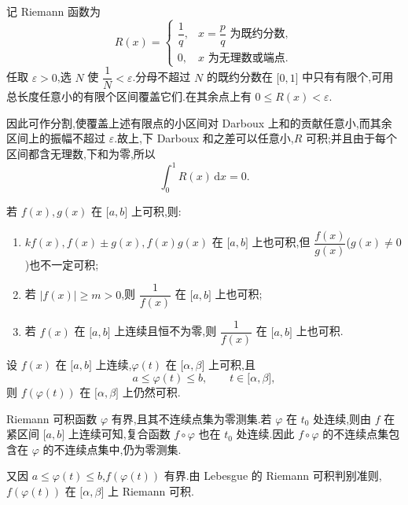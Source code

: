 \begin{solution}
    记 Riemann 函数为
    \[
        R(x)=
        \begin{cases}
            \dfrac{1}{q}, & x=\dfrac{p}{q}\text{ 为既约分数}, \\
            0,            & x\text{ 为无理数或端点}.
        \end{cases}
    \]
    任取 $\varepsilon>0$,选 $N$ 使 $\dfrac{1}{N}<\varepsilon$.分母不超过 $N$ 的既约分数在 $\lbrack0,1\rbrack$ 中只有有限个,可用总长度任意小的有限个区间覆盖它们.在其余点上有 $0\leq R(x)<\varepsilon$.

    因此可作分割,使覆盖上述有限点的小区间对 Darboux 上和的贡献任意小,而其余区间上的振幅不超过 $\varepsilon$.故上,下 Darboux 和之差可以任意小,$R$ 可积;并且由于每个区间都含无理数,下和为零,所以
    \[
        \displaystyle\int_0^1R(x)\,\mathrm{d}x=0.
    \]
\end{solution}

\begin{theorem}
    若 $f(x),g(x)$ 在 $\lbrack a,b\rbrack$ 上可积,则:
    \begin{enumerate}
        \item $kf(x),f(x)\pm g(x),f(x)g(x)$ 在 $\lbrack a,b\rbrack$ 上也可积,但 $\dfrac{f(x)}{g(x)}$($g(x)\neq0$)也不一定可积;
        \item 若 $|f(x)|\geq m>0$,则 $\dfrac{1}{f(x)}$ 在 $\lbrack a,b\rbrack$ 上也可积;
        \item 若 $f(x)$ 在 $\lbrack a,b\rbrack$ 上连续且恒不为零,则 $\dfrac{1}{f(x)}$ 在 $\lbrack a,b\rbrack$ 上也可积.
    \end{enumerate}
\end{theorem}

\begin{example}[\markstar\ 复合]
    设 $f(x)$ 在 $\lbrack a,b\rbrack$ 上连续,$\varphi(t)$ 在 $\lbrack \alpha,\beta\rbrack$ 上可积,且
    \[
        a\leq\varphi(t)\leq b,
        \qquad t\in\lbrack \alpha,\beta\rbrack,
    \]
    则 $f(\varphi(t))$ 在 $\lbrack \alpha,\beta\rbrack$ 上仍然可积.
\end{example}
\exampleblank

\begin{solution}
    Riemann 可积函数 $\varphi$ 有界,且其不连续点集为零测集.若 $\varphi$ 在 $t_0$ 处连续,则由 $f$ 在紧区间 $\lbrack a,b\rbrack$ 上连续可知,复合函数 $f\circ\varphi$ 也在 $t_0$ 处连续.因此 $f\circ\varphi$ 的不连续点集包含在 $\varphi$ 的不连续点集中,仍为零测集.

    又因 $a\leq\varphi(t)\leq b$,$f(\varphi(t))$ 有界.由 Lebesgue 的 Riemann 可积判别准则,$f(\varphi(t))$ 在 $\lbrack\alpha,\beta\rbrack$ 上 Riemann 可积.
\end{solution}

